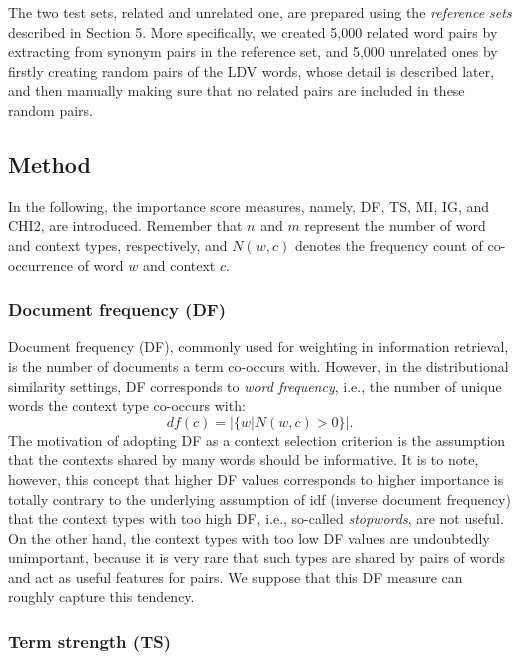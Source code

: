 \documentclass[english]{jnlp_1.4}
\begin{document}
The two test sets, related and unrelated one, are prepared using the
{\em reference sets} described in Section 5. More specifically, we
created 5,000 related word pairs by extracting from synonym pairs in
the reference set, and 5,000 unrelated ones by firstly creating random
pairs of the LDV words, whose detail is described later, and then
manually making sure that no related pairs are included in these
random pairs.

\subsection{Method}

In the following, the importance score measures, namely, DF, TS, MI,
IG, and CHI2, are introduced. Remember that $n$ and $m$ represent the
number of word and context types, respectively, and $N(w, c)$ denotes
the frequency count of co-occurrence of word $w$ and context $c$.

\subsubsection{Document frequency (DF)}

Document frequency (DF), commonly used for weighting in information
retrieval, is the number of documents a term co-occurs with. However,
in the distributional similarity settings, DF corresponds to {\em word
frequency}, i.e., the number of unique words the context type
co-occurs with:
\[
  df(c) = |\{w | N(w, c) > 0\}|.
\]
The motivation of adopting DF as a context selection criterion is the
assumption that the contexts shared by many words should be
informative. It is to note, however, this concept that higher DF
values corresponds to higher importance is totally contrary to the
underlying assumption of idf (inverse document frequency) that the
context types with too high DF, i.e., so-called {\em stopwords}, are
not useful. On the other hand, the context types with too low DF
values are undoubtedly unimportant, because it is very rare that such
types are shared by pairs of words and act as useful features for
pairs. We suppose that this DF measure can roughly capture this
tendency.

\subsubsection{Term strength (TS)}
\end{document}
